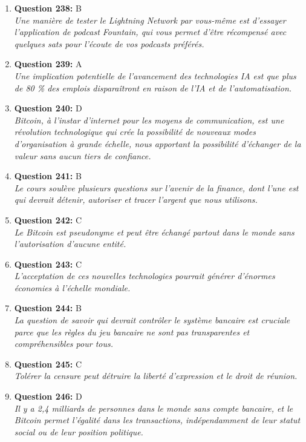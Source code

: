 \documentclass[12pt,a4paper]{article}
\begin{document}
\begin{enumerate}
\item \textbf{Question 238:} B
\\ \textit{Une manière de tester le Lightning Network par vous-même est d'essayer l'application de podcast Fountain, qui vous permet d'être récompensé avec quelques sats pour l'écoute de vos podcasts préférés.}

\item \textbf{Question 239:} A
\\ \textit{Une implication potentielle de l'avancement des technologies IA est que plus de 80 \% des emplois disparaîtront en raison de l'IA et de l'automatisation.}

\item \textbf{Question 240:} D
\\ \textit{Bitcoin, à l'instar d'internet pour les moyens de communication, est une révolution technologique qui crée la possibilité de nouveaux modes d'organisation à grande échelle, nous apportant la possibilité d'échanger de la valeur sans aucun tiers de confiance.}

\item \textbf{Question 241:} B
\\ \textit{Le cours soulève plusieurs questions sur l'avenir de la finance, dont l'une est qui devrait détenir, autoriser et tracer l'argent que nous utilisons.}

\item \textbf{Question 242:} C
\\ \textit{Le Bitcoin est pseudonyme et peut être échangé partout dans le monde sans l'autorisation d'aucune entité.}

\item \textbf{Question 243:} C
\\ \textit{L'acceptation de ces nouvelles technologies pourrait générer d'énormes économies à l'échelle mondiale.}

\item \textbf{Question 244:} B
\\ \textit{La question de savoir qui devrait contrôler le système bancaire est cruciale parce que les règles du jeu bancaire ne sont pas transparentes et compréhensibles pour tous.}

\item \textbf{Question 245:} C
\\ \textit{Tolérer la censure peut détruire la liberté d'expression et le droit de réunion.}

\item \textbf{Question 246:} D
\\ \textit{Il y a 2,4 milliards de personnes dans le monde sans compte bancaire, et le Bitcoin permet l'égalité dans les transactions, indépendamment de leur statut social ou de leur position politique.}


\end{enumerate}
\end{document}
